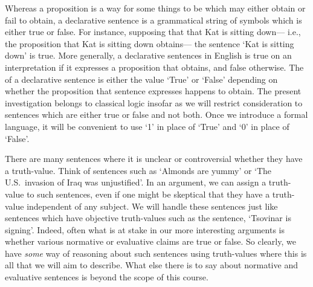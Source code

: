 Whereas a proposition is a way for some things to be which may either obtain or fail to obtain, a declarative sentence is a grammatical string of symbols which is either true or false.
For instance, supposing that that Kat is sitting down--- i.e., the proposition that Kat is sitting down obtains--- the sentence `Kat is sitting down' is true.
More generally, a declarative sentences in English is true on an interpretation if it expresses a proposition that obtains, and false otherwise.
The  of a declarative sentence is either the value `True' or `False' depending on whether the proposition that sentence expresses happens to obtain.
The present investigation belongs to classical logic insofar as we will restrict consideration to sentences which are either true or false and not both.
Once we introduce a formal language, it will be convenient to use `1' in place of `True' and `0' in place of `False'.



There are many sentences where it is unclear or controversial whether they have a truth-value.
Think of sentences such as `Almonds are yummy' or `The U.S.\ invasion of Iraq was unjustified'.
In an argument, we can assign a truth-value to such sentences, even if one might be skeptical that they have a truth-value independent of any subject.
We will handle these sentences just like sentences which have objective truth-values such as the sentence, `Tsovinar is signing'.
Indeed, often what is at stake in our more interesting arguments is whether various normative or evaluative claims are true or false.
So clearly, we have \textit{some} way of reasoning about such sentences using truth-values where this is all that we will aim to describe.
What else there is to say about normative and evaluative sentences is beyond the scope of this course.

